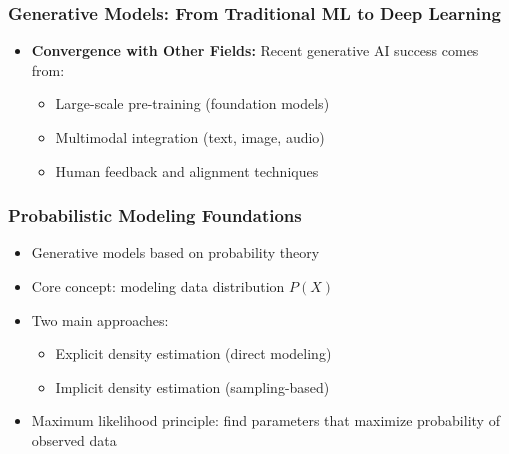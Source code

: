 \documentclass[5pt,aspectratio=169]{beamer}
\begin{document}
\begin{frame}
\frametitle{Generative Models: From Traditional ML to Deep Learning}

\begin{itemize}

\item \textbf{Convergence with Other Fields:} Recent generative AI success comes from:
  \begin{itemize}
  \item Large-scale pre-training (foundation models)
  \item Multimodal integration (text, image, audio)
  \item Human feedback and alignment techniques
  \end{itemize}
\end{itemize}
\end{frame}
\begin{frame}
\frametitle{Probabilistic Modeling Foundations}
\begin{itemize}
    \item Generative models based on probability theory
    \item Core concept: modeling data distribution $P(X)$
    \item Two main approaches:
    \begin{itemize}
        \item Explicit density estimation (direct modeling)
        \item Implicit density estimation (sampling-based)
    \end{itemize}
    \item Maximum likelihood principle: find parameters that maximize probability of observed data
\end{itemize}

\begin{center}

\end{center}
\end{frame}
\end{document}
